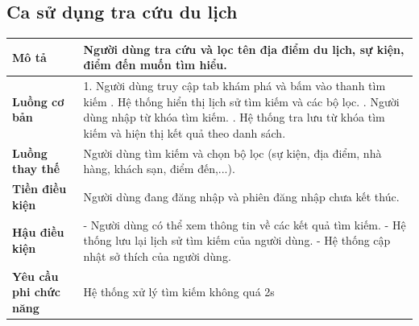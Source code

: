 \subsection{Ca sử dụng tra cứu du lịch}
\vspace{0.5cm}


\noindent 
\begin{tabularx}{\linewidth}{| l | X |} 
\hline 
\textbf{Mô tả} & Người dùng tra cứu và lọc tên địa điểm du lịch, sự kiện, điểm đến muốn tìm hiểu.  \\ 
\hline 
\textbf{Luồng cơ bản} & 1. Người dùng truy cập tab khám phá và bấm vào thanh tìm kiếm \newline
                       2. Hệ thống hiển thị lịch sử tìm kiếm và các bộ lọc. \newline
                       3. Người dùng nhập từ khóa tìm kiếm. \newline
                       4. Hệ thống tra lưu từ khóa tìm kiếm và hiện thị kết quả theo danh sách. \\
\hline 
\textbf{Luồng thay thế} & Người dùng tìm kiếm và chọn bộ lọc (sự kiện, địa điểm, nhà hàng, khách sạn, điểm đến,...).\\
                         
\hline 
\textbf{Tiền điều kiện} & Người dùng đang đăng nhập và phiên đăng nhập chưa kết thúc. \\
\hline 
\textbf{Hậu điều kiện} & - Người dùng có thể xem thông tin về các kết quả tìm kiếm.\newline
                         - Hệ thống lưu lại lịch sử tìm kiếm của người dùng. \newline
                         - Hệ thống cập nhật sở thích của người dùng. \\

\hline 
\textbf{Yêu cầu phi chức năng} & Hệ thống xử lý tìm kiếm không quá 2s  \\ 
\hline 
\end{tabularx}

\vspace{0.8cm}

